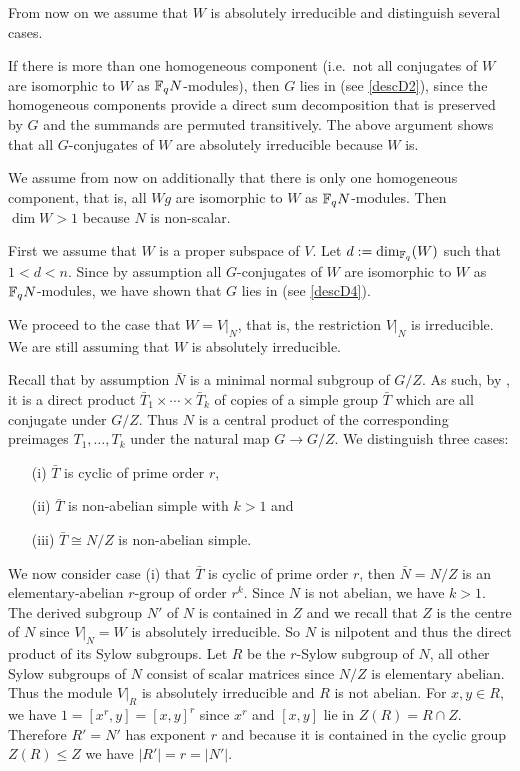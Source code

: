 From now on we assume that $W$ is absolutely irreducible and
distinguish several cases.

If there is more than one homogeneous component (i.e.~not all conjugates of
$W$ are isomorphic to $W$ as $\mathbb{F}_q N$-modules), then $G$ lies in 
(see \ref{descD2}),
since the homogeneous components provide a direct sum decomposition that is
preserved by $G$ and the summands are permuted transitively. The above
argument shows that all $G$-conjugates of $W$ are absolutely
irreducible because $W$ is.

We assume from now on additionally that there is only one homogeneous
component, that is, all $Wg$ are isomorphic to $W$ as $\mathbb{F}_q N$-modules.
Then $\dim W > 1$ because $N$ is non-scalar.

First we assume that $W$ is a proper subspace of $V$. Let $d :=
\dim_{\mathbb{F}_q}(W)$ such that $1 < d < n$. Since by assumption 
all $G$-conjugates of $W$ are isomorphic to $W$ as $\mathbb{F}_q N$-modules,
we have shown that $G$ lies in  (see \ref{descD4}).

We proceed to the case that $W = V|_N$, that is, the restriction
$V|_N$ is irreducible. We are still assuming that $W$ is
absolutely irreducible.

Recall that by assumption $\bar N$ is a minimal normal subgroup of $G/Z$.
As such, by \cite[Theorem 4.3A.(iii)]{DixonMort}, it is
a direct product $\bar T_1 \times \cdots \times \bar T_k$ of copies of a 
simple group $\bar T$ which are all conjugate under $G/Z$. Thus $N$ is
a central product of the corresponding preimages $T_1, \ldots, T_k$
under the natural map $G \to G/Z$. We distinguish three cases:
\begin{itemize}\setlength{\itemsep}{0pt}\setlength{\parskip}{0pt}
\item[(i)] $\bar T$ is cyclic of prime order $r$, 
\item[(ii)] $\bar T$ is non-abelian simple with $k > 1$ and
\item[(iii)] $\bar T \cong N/Z$ is non-abelian simple.
\end{itemize}
We now consider case (i) that $\bar T$ is cyclic of prime order $r$, then
$\bar N = N/Z$ is an elementary-abelian $r$-group of order $r^k$.
Since $N$ is not abelian, we have $k > 1$.
The derived subgroup $N'$ of $N$ is contained in $Z$ and
we recall that $Z$ is the centre of $N$ since $V|_N = W$ is absolutely
irreducible. So $N$ is nilpotent and thus the direct product of its
Sylow subgroups. Let $R$ be the $r$-Sylow subgroup of $N$, all other
Sylow subgroups of $N$ consist of scalar matrices since $N/Z$ is
elementary abelian. Thus the module $V|_R$ is absolutely irreducible
and $R$ is not abelian.
For $x,y \in R$, we have $1 = [x^r,y] = [x,y]^r$ since $x^r$ and 
$[x,y]$ lie in $Z(R) = R \cap Z$. Therefore $R'=N'$ has exponent $r$ and
because it is contained in the cyclic group $Z(R) \le Z$ we have $|R'| =
r = |N'|$.

